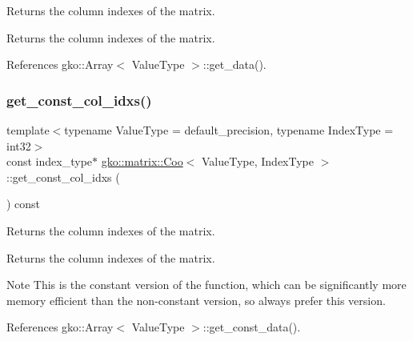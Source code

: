 Returns the column indexes of the matrix. 

\begin{DoxyReturn}{Returns}
the column indexes of the matrix. 
\end{DoxyReturn}


References gko\+::\+Array$<$ Value\+Type $>$\+::get\+\_\+data().

\mbox{\label{classgko_1_1matrix_1_1Coo_ae4afdbf2dc5a5a42a197f3a479febc75}} 
\subsubsection{\texorpdfstring{get\+\_\+const\+\_\+col\+\_\+idxs()}{get\_const\_col\_idxs()}}
{\footnotesize\ttfamily template$<$typename Value\+Type = default\+\_\+precision, typename Index\+Type = int32$>$ \\
const index\+\_\+type$\ast$ \hyperlink{classgko_1_1matrix_1_1Coo}{gko\+::matrix\+::\+Coo}$<$ Value\+Type, Index\+Type $>$\+::get\+\_\+const\+\_\+col\+\_\+idxs (\begin{DoxyParamCaption}{ }\end{DoxyParamCaption}) const\hspace{0.3cm}{\ttfamily [noexcept]}}



Returns the column indexes of the matrix. 

\begin{DoxyReturn}{Returns}
the column indexes of the matrix.
\end{DoxyReturn}
\begin{DoxyNote}{Note}
This is the constant version of the function, which can be significantly more memory efficient than the non-\/constant version, so always prefer this version. 
\end{DoxyNote}


References gko\+::\+Array$<$ Value\+Type $>$\+::get\+\_\+const\+\_\+data().

\mbox{\label{classgko_1_1matrix_1_1Coo_a0fe0f33bf492bf2f9134927c7ee90e81}} 
